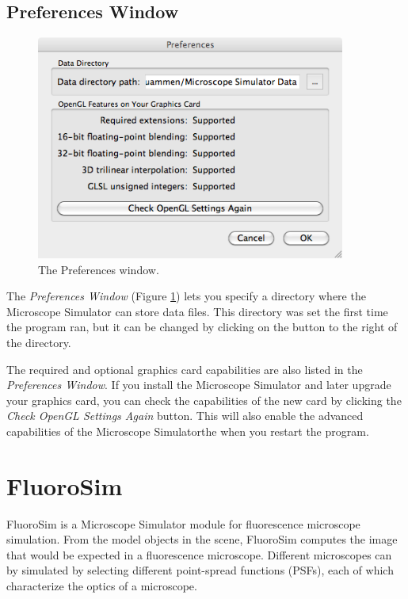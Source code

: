 \documentclass[11pt,titlepage,twoside]{article}
\begin{document}
\subsection{Preferences Window}
\label{sec:PreferencesWindow}

\begin{figure}[htbp] %
   \centering
   \includegraphics[width=4in]{images/PreferencesWindow} 
   \caption{The Preferences window.}
   \label{fig:PreferencesWindow}
\end{figure}

The \emph{Preferences Window} (Figure \ref{fig:PreferencesWindow}) lets you specify a directory where the Microscope Simulator can store data files. This directory was set the first time the program ran, but it can be changed by clicking on the button to the right of the directory.

The required and optional graphics card capabilities are also listed in the \emph{Preferences Window}. If you install the Microscope Simulator and later upgrade your graphics card, you can check the capabilities of the new card by clicking the \emph{Check OpenGL Settings Again} button. This will also enable the advanced capabilities of the Microscope Simulatorthe when you restart the program.

\section{FluoroSim}
\label{sec:FluoroSim}

FluoroSim is a Microscope Simulator module for fluorescence microscope simulation. From the model objects in the scene, FluoroSim computes the image that would be expected in a fluorescence microscope. Different microscopes can by simulated by selecting different point-spread functions (PSFs), each of which characterize the optics of a microscope.
\end{document}
